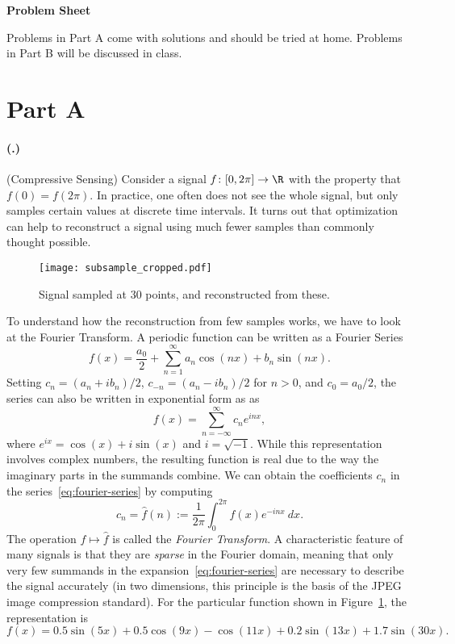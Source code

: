 \documentclass{article}
\newcounter{problemSheetNumber}
\newcounter{problems}
\renewcommand{\problem}{\paragraph{(\theproblemSheetNumber.\theproblems)}\addtocounter{problems}{1}}
\begin{document}
 
\begin{center}
{\Large {\bf Problem Sheet \theproblemSheetNumber}}
\end{center}

Problems in Part A come with solutions and should be tried at home. Problems in Part B will be discussed in class.

\section*{Part A}
\problem (Compressive Sensing) Consider a signal $f\colon [0,2\pi]\to \R$
with the property that $f(0)=f(2\pi)$. In practice, one often does not see the whole signal, but only samples certain values at discrete time intervals. It turns out that optimization can help to reconstruct a signal using much fewer samples than commonly thought possible.

\begin{figure}[h!]
 \centering
 \texttt{[image: subsample\_cropped.pdf]}
 \caption{Signal sampled at 30 points, and reconstructed from these.}
\label{fig:subsample}
\end{figure}

To understand how the reconstruction from few samples works, we have to look at the Fourier Transform. A periodic function can be written as a Fourier Series
\begin{equation*}
 f(x) = \frac{a_0}{2}+\sum_{n=1}^\infty a_n\cos(nx)+b_n\sin(nx).
\end{equation*}
Setting $c_n=(a_n+ib_n)/2$, $c_{-n}=(a_n-ib_n)/2$ for $n>0$, and $c_0=a_0/2$, the series can also be written in exponential form as as
\begin{equation}\label{eq:fourier-series}\tag{1}
 f(x) = \sum_{n=-\infty}^\infty c_n e^{inx},
\end{equation}
where $e^{ix} = \cos(x)+i\sin(x)$ and $i=\sqrt{-1}$. While this representation involves complex numbers, the resulting function is real due to the way the imaginary parts in the summands combine. 
We can obtain the coefficients $c_n$ in the series~\eqref{eq:fourier-series} by computing
\begin{equation*}
 c_n = \hat{f}(n) := \frac{1}{2\pi} \int_0^{2\pi} f(x) e^{-inx} \ dx.
\end{equation*}
The operation $f\mapsto \hat{f}$ is called the {\em Fourier Transform}. A characteristic feature of many signals is that they are {\em sparse} in the Fourier domain, meaning that only very few summands in the expansion~\eqref{eq:fourier-series} are necessary to describe the signal accurately (in two dimensions, this principle is the basis of the JPEG image compression standard). For the particular function shown in Figure~\ref{fig:subsample}, the representation is 
\begin{equation}\label{eq:signal}\tag{2}
 f(x) = 0.5\sin(5x)+0.5\cos(9x)-\cos(11x)+0.2\sin(13x)+1.7\sin(30x).
\end{equation}
\end{document}
